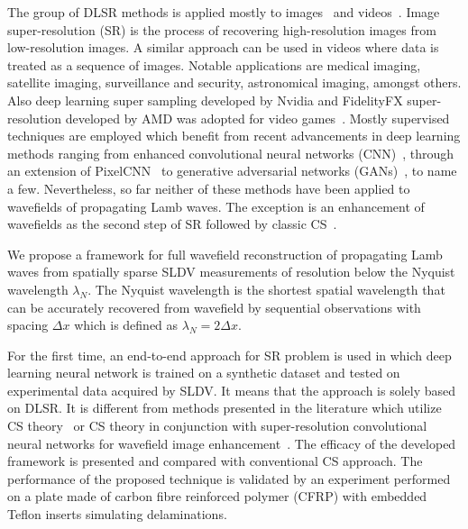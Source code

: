 The group of DLSR methods is applied mostly to images~\cite{Dahl2017,Zhang2018,Wang2019} and videos~\cite{Zhang2017,Yan2019}.
Image super-resolution (SR) is the process of recovering high-resolution images from low-resolution images.
A similar approach can be used in videos where data is treated as a sequence of images.
Notable applications are medical imaging, satellite imaging, surveillance and security, astronomical imaging, amongst others.
Also deep learning super sampling developed by Nvidia and FidelityFX super-resolution developed by AMD was adopted for video games~\cite{Claypool2006}.
Mostly supervised techniques are employed
which benefit from recent advancements in deep learning methods ranging from enhanced convolutional neural networks (CNN)~\cite{Zhang2017}, through an extension of PixelCNN~\cite{Dahl2017} to generative adversarial networks (GANs)~\cite{Wang2019}, to name a few.
Nevertheless, so far neither of these methods have been applied to wavefields of propagating Lamb waves.
The exception is an enhancement of wavefields as the second step of SR followed by classic CS~\cite{Park2017a,KeshmiriEsfandabadi2020}.

We propose a framework for full wavefield reconstruction of propagating Lamb waves from spatially sparse SLDV measurements of resolution below the Nyquist wavelength $\lambda_N$. 
The Nyquist wavelength is the shortest spatial wavelength that can be accurately recovered from wavefield by sequential observations with spacing $\Delta x$ which is defined as $\lambda_N = 2 \Delta x$. 

For the first time, an end-to-end approach for SR problem is used in which deep learning neural network is trained on a synthetic dataset and tested on experimental data acquired by SLDV.
It means that the approach is solely based on DLSR.
It is different from methods presented in the literature which utilize CS theory~\cite{Harley2013,KeshmiriEsfandabadi2018} or CS theory in conjunction with super-resolution convolutional neural networks for wavefield image enhancement~\cite{Park2017a,KeshmiriEsfandabadi2020}.
The efficacy of the developed framework is presented and compared with conventional CS approach.  
The performance of the proposed technique is validated by an experiment performed on a plate made of carbon fibre reinforced polymer (CFRP) with embedded Teflon inserts simulating delaminations.
